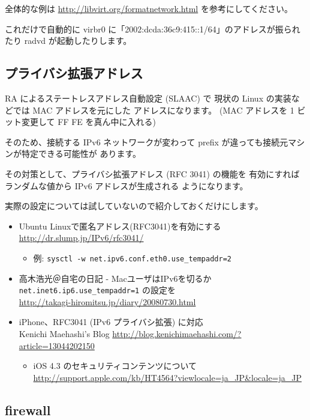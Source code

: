 \documentclass[mingoth,a4paper]{jsarticle}
\begin{document}
全体的な例は \url{http://libvirt.org/formatnetwork.html} を参考にしてください。

これだけで自動的に virbr0 に「2002:dcda:36c9:415::1/64」のアドレスが振られたり radvd が起動したりします。
\subsection{プライバシ拡張アドレス}

RA によるステートレスアドレス自動設定 (SLAAC) で
現状の Linux の実装などでは MAC アドレスを元にした
アドレスになります。
(MAC アドレスを 1 ビット変更して FF FE を真ん中に入れる)

そのため、接続する IPv6 ネットワークが変わって
prefix が違っても接続元マシンが特定できる可能性が
あります。

その対策として、プライバシ拡張アドレス (RFC 3041) の機能を
有効にすればランダムな値から IPv6 アドレスが生成される
ようになります。

実際の設定については試していないので紹介しておくだけにします。

\begin{itemize}
\item Ubuntu Linuxで匿名アドレス(RFC3041)を有効にする \url{http://dr.slump.jp/IPv6/rfc3041/}

\begin{itemize}
\item 例: \texttt{sysctl -w net.ipv6.conf.eth0.use\_tempaddr=2}
\end{itemize}
\item 高木浩光＠自宅の日記 - MacユーザはIPv6を切るか \texttt{net.inet6.ip6.use\_tempaddr=1} の設定を \\
  \url{http://takagi-hiromitsu.jp/diary/20080730.html}
\item iPhone、RFC3041 (IPv6 プライバシ拡張) に対応\\
  Kenichi Maehashi's Blog \url{http://blog.kenichimaehashi.com/?article=13044202150}
\begin{itemize}
\item iOS 4.3 のセキュリティコンテンツについて\\
  \url{http://support.apple.com/kb/HT4564?viewlocale=ja_JP&locale=ja_JP}
\end{itemize}

\end{itemize}
\subsection{firewall}
\end{document}
